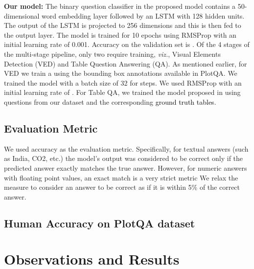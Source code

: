 \documentclass[10pt,twocolumn,letterpaper]{article}
\begin{document}
\noindent\textbf{Our model:}
The binary question classifier in the proposed model contains a 50-dimensional word embedding layer followed by an LSTM with 128 hidden units. The output of the LSTM is projected to 256 dimensions and this is then fed to the output layer. The model is trained for 10 epochs using RMSProp with an initial learning rate of 0.001. Accuracy on the validation set is .
Of the 4 stages of the multi-stage pipeline, only two require training, \textit{viz.}, Visual Elements Detection (VED) and Table Question Answering (QA). 
As mentioned earlier, for VED we train a  using the bounding box annotations available in PlotQA. 
We trained the model with a batch size of 32 for  steps. We used RMSProp with an initial learning rate of . 
For Table QA, we trained the model proposed in \cite{PasupatL15} using questions from our dataset and the corresponding \textcolor{black}{ground truth tables}. 




\subsection{Evaluation Metric} We used accuracy as the evaluation metric. Specifically, for textual answers (such as India, CO2, etc.) the model's output was considered to be correct only if the predicted answer exactly matches the true answer. However, for numeric answers with floating point values, an exact match is a very strict metric 
We relax the measure to consider an answer to be correct as if it is within 5\% of the correct answer. 





\subsection{Human Accuracy on PlotQA dataset}



\section{Observations and Results}
\end{document}
